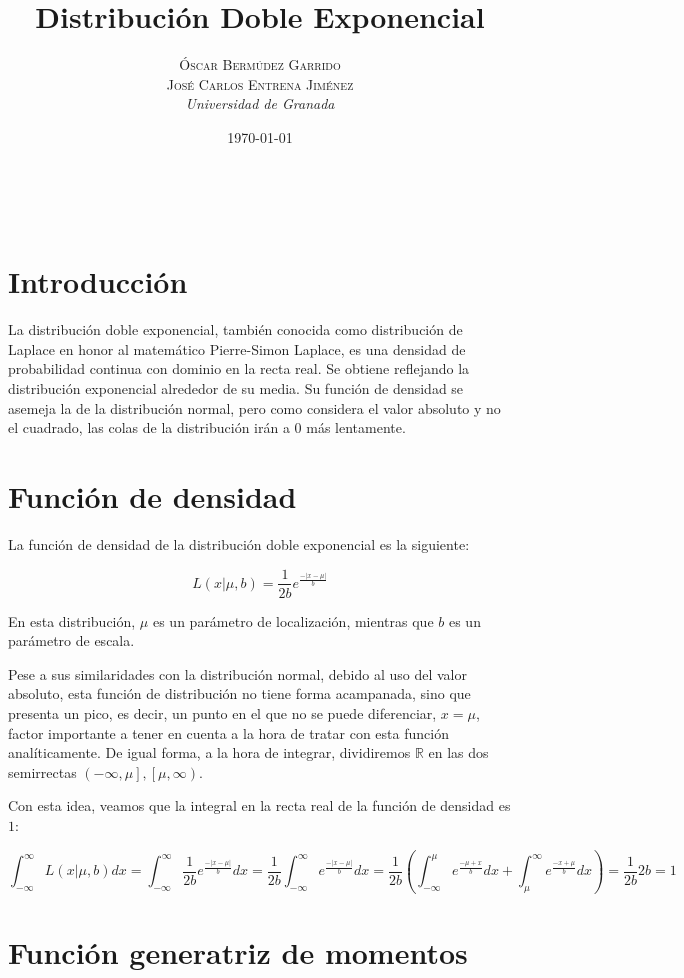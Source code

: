 \documentclass[a4paper, 10pt]{article} %
\title{\textbf{Distribución Doble Exponencial}\\ %
\vspace{20 pt}
} %
\author{\textsc{Óscar Bermúdez Garrido\\José Carlos Entrena Jiménez} %
\\{\textit{Universidad de Granada}}} %
\date{\today} %
\makeatletter
\renewcommand{\maketitle}{ %
\begin{center} %
{\Huge\@title} %
\end{center}

\vspace{20pt} %

\begin{flushright} %
{\large\@author} %
\\\@date %

\vspace{40pt} %
\end{flushright}
\renewcommand{\baselinestretch}{0.5}

}
\makeatother
\begin{document}
\maketitle
\tableofcontents
\pagebreak

\section{Introducción}

La distribución doble exponencial, también conocida como distribución de Laplace en honor al matemático Pierre-Simon Laplace, es una densidad de probabilidad continua con dominio en la recta real. Se obtiene reflejando la distribución exponencial alrededor de su media. Su función de densidad se asemeja la de la distribución normal, pero como considera el valor absoluto y no el cuadrado, las colas de la distribución irán a $0$ más lentamente. 

\section{Función de densidad}

La función de densidad de la distribución doble exponencial es la siguiente: 

$$L(x|\mu, b)=\frac{1}{2b}e^\frac{-|x-\mu|}{b}$$

En esta distribución, $\mu$ es un parámetro de localización, mientras que $b$ es un parámetro de escala. 

Pese a sus similaridades con la distribución normal, debido al uso del valor absoluto, esta función de distribución no tiene forma acampanada, sino que presenta un pico, es decir, un punto en el que no se puede diferenciar, $x = \mu$, factor importante a tener en cuenta a la hora de tratar con esta función analíticamente. De igual forma, a la hora de integrar, dividiremos $\mathbb{R}$ en las dos semirrectas $\left(-\infty, \mu\right], \left[\mu, \infty\right)$.

Con esta idea, veamos que la integral en la recta real de la función de densidad es $1$: 

$$\int_{-\infty}^{\infty} L(x|\mu, b)dx = \int_{-\infty}^{\infty} \frac{1}{2b}e^\frac{-|x-\mu|}{b}dx =
\frac{1}{2b}\int_{-\infty}^{\infty}e^\frac{-|x-\mu|}{b}dx = 
\frac{1}{2b}\left( \int_{-\infty}^{\mu}e^\frac{-\mu+x}{b}dx + \int_{\mu}^{\infty}e^\frac{-x+\mu}{b}dx \right) =
\frac{1}{2b}2b = 1$$
 

\section{Función generatriz de momentos}
\end{document}

